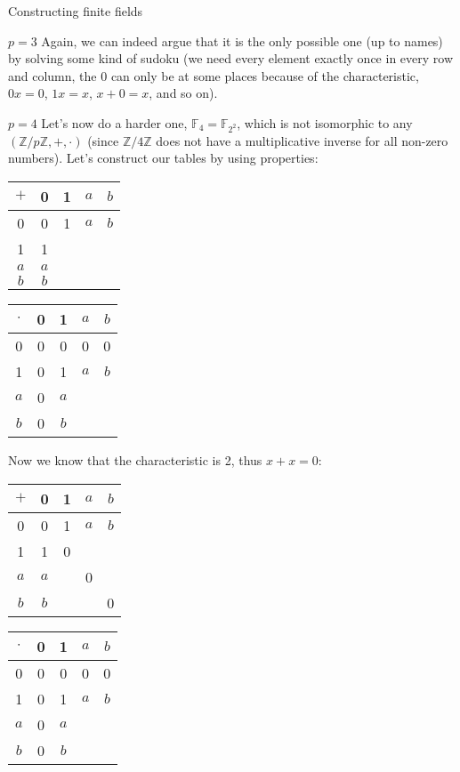 \documentclass[a4paper]{article}
\begin{document}
\begin{parag}{Constructing finite fields}
\begin{subparag}{$p = 3$}
        Again, we can indeed argue that it is the only possible one (up to names) by solving some kind of sudoku (we need every element exactly once in every row and column, the 0 can only be at some places because of the characteristic, $0x = 0$, $1x = x$, $x + 0 = x$, and so on).
    \end{subparag}

    \begin{subparag}{$p = 4$}
        Let's now do a harder one, $\mathbb{F}_4 = \mathbb{F}_{2^2}$, which is not isomorphic to any $\left(\mathbb{Z} / p\mathbb{Z}, +, \cdot\right)$ (since $\mathbb{Z} / 4\mathbb{Z}$ does not have a multiplicative inverse for all non-zero numbers). Let's construct our tables by using properties:
        \begin{center}
            \begin{tabular}{c|cccc}
                $+$ & 0 & 1 & $a$ & $b$ \\
                \hline
                0 & 0 & 1 & $a$ & $b$\\
                1 & 1   \\
                $a$ & $a$ \\
                $b$ & $b$
            \end{tabular}
            \hspace{1em}
            \begin{tabular}{c|cccc}
                $\cdot$ & 0 & 1 & $a$ & $b$\\
                \hline
                0 & 0 & 0 & 0 & 0\\
                1 & 0 & 1 & $a$ & $b$ \\
                $a$ & 0 & $a$  \\
                $b$ & 0 & $b$
            \end{tabular}
        \end{center}

        Now we know that the characteristic is 2, thus $x + x = 0$: 
        \begin{center}
            \begin{tabular}{c|cccc}
                $+$ & 0 & 1 & $a$ & $b$ \\
                \hline
                0 & 0 & 1 & $a$ & $b$\\
                1 & 1 & 0 \\
                $a$ & $a$ &  & 0\\
                $b$ & $b$ & & & 0
            \end{tabular}
            \hspace{1em}
            \begin{tabular}{c|cccc}
                $\cdot$ & 0 & 1 & $a$ & $b$\\
                \hline
                0 & 0 & 0 & 0 & 0\\
                1 & 0 & 1 & $a$ & $b$ \\
                $a$ & 0 & $a$  \\
                $b$ & 0 & $b$
            \end{tabular}
        \end{center}


\end{subparag}
\end{parag}
\end{document}
